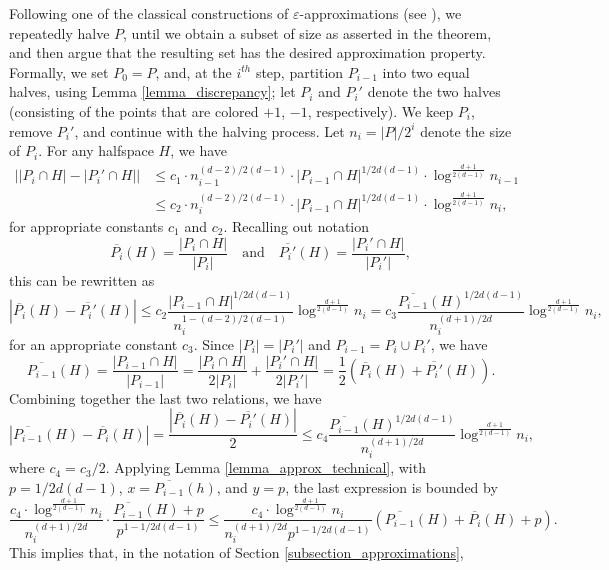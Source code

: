 \documentclass[11pt]{article}
\def\eps{\varepsilon}
\def\meas#1#2{\overline{#1}(#2)}
\begin{document}
 Following one of the classical constructions of $\eps$-approximations (see \cite{cha01}), we repeatedly halve $P$, until we obtain a subset of size as asserted in the theorem, and then argue that the resulting set has the desired approximation property. Formally, we set $P_{0} = P$, and, at the $i^{th}$ step, partition $P_{i-1}$ into two equal halves, using Lemma \ref{lemma_discrepancy}; let $P_{i}$ and $P_{i}'$ denote the two halves (consisting of the points that are colored $+1$, $-1$, respectively). We keep $P_{i}$, remove $P_{i}'$, and continue with the halving process. Let $n_{i} = |P|/2^{i}$ denote the size of $P_{i}$. For any halfspace $H$, we have
\begin{align*}
\left| |P_{i} \cap H| - |P_{i}' \cap H|\right| & \leq c_{1} \cdot n_{i-1}^{(d-2)/2(d-1)} \cdot |P_{i-1} \cap H|^{1/2d(d-1)} \cdot \log^{\frac{d+1}{2(d-1)}}n_{i-1} \\
& \leq c_{2} \cdot n_{i}^{(d-2)/2(d-1)} \cdot |P_{i-1} \cap H|^{1/2d(d-1)} \cdot \log^{\frac{d+1}{2(d-1)}}n_{i},
\end{align*}
for appropriate constants $c_{1}$ and $c_{2}$. Recalling out notation
$$
\meas{P_{i}}{H} = \frac{|P_{i} \cap H|}{|P_{i}|} \quad \text{and} \quad \meas{P_{i}'}{H} = \frac{|P_{i}' \cap H|}{|P_{i}'|},
$$
this can be rewritten as
$$
|\meas{P_{i}}{H} - \meas{P_{i}'}{H}| \leq c_{2} \frac{|P_{i-1} \cap H|^{1/2d(d-1)}}{n_{i}^{1 - (d-2)/2(d-1)}} \log^{\frac{d+1}{2(d-1)}} n_{i}= c_{3} \frac{ \meas{P_{i-1}}{H}^{1/2d(d-1)}}{n_{i}^{(d+1)/2d}} \log ^{\frac{d+1}{2(d-1)}}n_{i},
$$
for an appropriate constant $c_{3}$. Since $|P_{i}| = |P_{i}'|$ and $P_{i-1} = P_{i} \cup P_{i}'$, we have
$$
\meas{P_{i-1}}{H} = \frac{|P_{i-1} \cap H|}{|P_{i-1}|} = \frac{|P_{i} \cap H|}{2|P_{i}|} + \frac{|P_{i}' \cap H|}{2|P_{i}'|} = \frac{1}{2}\left(\meas{P_{i}}{H} + \meas{P_{i}'}{H}    \right).
$$
Combining together the last two relations, we have
$$
|\meas{P_{i-1}}{H} - \meas{P_{i}}{H}| = \frac{|\meas{P_{i}}{H} - \meas{P_{i}'}{H}|}{2} \leq
c_{4} \frac{\meas{P_{i-1}}{H}^{1/2d(d-1)}}{n_{i}^{(d+1)/2d}} \log^{\frac{d+1}{2(d-1)}}n_{i},
$$
where $c_{4} = c_{3}/2$. Applying Lemma \ref{lemma_approx_technical}, with $p = 1/2d(d-1)$, $x = \meas{P_{i-1}}{h}$, and $y = p$, the last expression is bounded by
$$
\frac{c_{4} \cdot \log^{\frac{d+1}{2(d-1)}}n_{i}}{n_{i}^{(d+1)/2d}} \cdot \frac{\meas{P_{i-1}}{H} + p }{p^{1-1/2d(d-1)}} \leq \frac{c_{4} \cdot \log^{\frac{d+1}{2(d-1)}}n_{i}}{n_{i}^{(d+1)/2d} p^{1-1/2d(d-1)}} \left(\meas{P_{i-1}}{H} + \meas{P_{i}}{H} + p \right).
$$
This implies that, in the notation of Section \ref{subsection_approximations},
\end{document}
